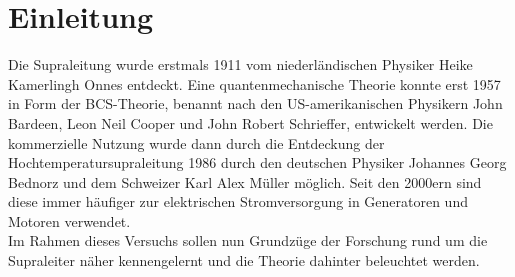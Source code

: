 \chapter{Einleitung}
Die Supraleitung wurde erstmals 1911 vom niederländischen Physiker Heike Kamerlingh
Onnes entdeckt. Eine quantenmechanische Theorie konnte erst 1957 in Form der 
BCS-Theorie, benannt nach den US-amerikanischen Physikern John Bardeen, Leon Neil 
Cooper und John Robert Schrieffer, entwickelt werden.
Die kommerzielle Nutzung wurde dann durch die Entdeckung der 
Hochtemperatursupraleitung 1986 durch den deutschen Physiker Johannes Georg Bednorz
und dem Schweizer Karl Alex Müller möglich. Seit den 2000ern sind diese immer 
häufiger zur elektrischen Stromversorgung in Generatoren und Motoren verwendet.\\
Im Rahmen dieses Versuchs sollen nun Grundzüge der Forschung rund um die Supraleiter
näher kennengelernt und die Theorie dahinter beleuchtet werden. \cite{suprawiki}

